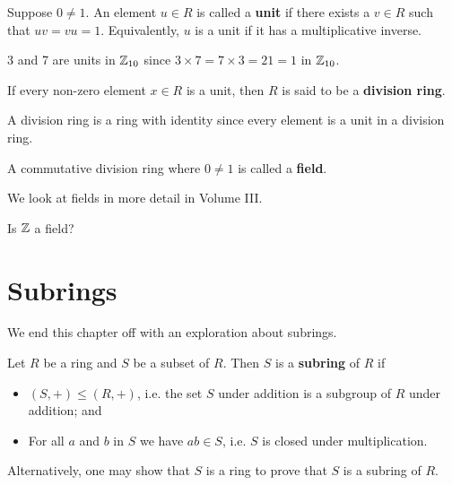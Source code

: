 \begin{definition}
    Suppose $0 \neq 1$. An element $u \in R$ is called a \textbf{unit} if there exists a $v \in R$ such that $uv=vu=1$. Equivalently, $u$ is a unit if it has a multiplicative inverse.
\end{definition}
\begin{example}
    3 and 7 are units in $\mathbb{Z}_{10}$ since $3 \times 7 = 7 \times 3 = 21 = 1$ in $\mathbb{Z}_{10}$.
\end{example}

\begin{definition}
    If every non-zero element $x \in R$ is a unit, then $R$ is said to be a \textbf{division ring}.
\end{definition}
\begin{remark}
    A division ring is a ring with identity since every element is a unit in a division ring.
\end{remark}

\begin{definition}
    A commutative division ring where $0 \neq 1$ is called a \textbf{field}.
\end{definition}
We look at fields in more detail in Volume III.

\begin{exercise}\label{exercise-Z-is-not-a-field}
    Is $\mathbb{Z}$ a field?
\end{exercise}

\section{Subrings}
We end this chapter off with an exploration about subrings.

\begin{definition}
    Let $R$ be a ring and $S$ be a subset of $R$. Then $S$ is a \textbf{subring} of $R$ if
    \begin{itemize}
        \item $(S, +) \leq (R, +)$, i.e. the set $S$ under addition is a subgroup of $R$ under addition; and
        \item For all $a$ and $b$ in $S$ we have $ab \in S$, i.e. $S$ is closed under multiplication.
    \end{itemize}
\end{definition}
\begin{remark}
    Alternatively, one may show that $S$ is a ring to prove that $S$ is a subring of $R$.
\end{remark}

